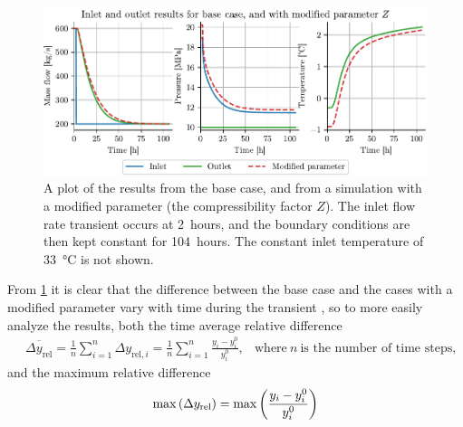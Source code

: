 \begin{figure}[!ht]%
    \centering%
    \includegraphics{figures/base_case_with_adjusted_Z_horiz.pdf}%
    \caption{%
        A plot of the results from the base case, and from a simulation with a modified parameter (the compressibility factor $Z$). The inlet flow rate transient occurs at 2~hours, and the boundary conditions are then kept constant for 104~hours. The constant inlet temperature of \SI{33}{\celsius} is not shown.
        \label{fig:baseCaseWithZ}%
    }%
\end{figure}%
From \cref{fig:baseCaseWithZ} it is clear that the difference between the base case and the cases with a modified parameter vary with time during the transient%
, so to more easily analyze the results, both the time average relative difference
\begin{align}
    &\overbar{\Delta y_\mathrm{rel}}
    = \frac{1}{n} \sum_{i=1}^n \Delta y_{\mathrm{rel}, i}
    = \frac{1}{n} \sum_{i=1}^n \frac{y_i - y_i^0}{y_i^0},
    &\text{where}~n~\text{is the number of time steps,}
\end{align}
and the maximum relative difference
\begin{align}
    \max\del{\Delta y_\mathrm{rel}} = \max\del{\frac{y_i - y_i^0}{y_i^0}}
\end{align}
